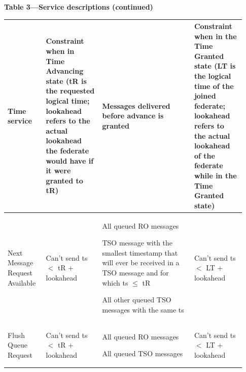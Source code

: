 \begin{compactstdpage}

    \begin{center}
        {\sffamily\bfseries\fontsize{8.1}{9.3}\selectfont Table 3---Service descriptions (continued)}\par\vspace{3pt}
    {\fontsize{5.8}{6.7}\selectfont\setlength{\tabcolsep}{1.6pt}\renewcommand{\arraystretch}{1.16}%
        \begin{tabular}{|>{\raggedright\arraybackslash}p{0.15\linewidth}|>{\raggedright\arraybackslash}p{0.22\linewidth}|>{\raggedright\arraybackslash}p{0.36\linewidth}|>{\raggedright\arraybackslash}p{0.20\linewidth}|}
            \hline
            \centering\textbf{Time service} & \centering\textbf{Constraint when in Time Advancing state (tR is the requested logical time; lookahead refers to the actual lookahead the federate would have if it were granted to tR)} & \centering\textbf{Messages delivered before advance is granted} & \centering\arraybackslash\textbf{Constraint when in the Time Granted state (LT is the logical time of the joined federate; lookahead refers to the actual lookahead of the federate while in the Time Granted state)} \\ \hline
            Next Message Request Available  & Can't send ts $<$ tR + lookahead                                                                                                                                                         & All queued RO messages\par TSO message with the smallest timestamp that will ever be received in a TSO message and for which ts $\leq$ tR\par All other queued TSO messages with the same ts & Can't send ts $<$ LT + lookahead \\ \hline
            Flush Queue Request             & Can't send ts $<$ tR + lookahead                                                                                                                                                         & All queued RO messages\par All queued TSO messages & Can't send ts $<$ LT + lookahead \\ \hline
        \end{tabular}}
    \end{center}


\end{compactstdpage}
